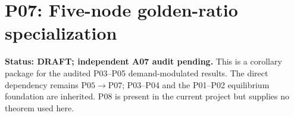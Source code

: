 
\section{P07: Five-node golden-ratio specialization}
\label{sec:P07}
\noindent\textbf{Status: DRAFT; independent A07 audit pending.}
This is a corollary package for the audited P03--P05 demand-modulated
results. The direct dependency remains $\mathrm{P05}\to\mathrm{P07}$;
P03--P04 and the P01--P02 equilibrium foundation are inherited.
P08 is present in the current project but supplies no theorem used here.

